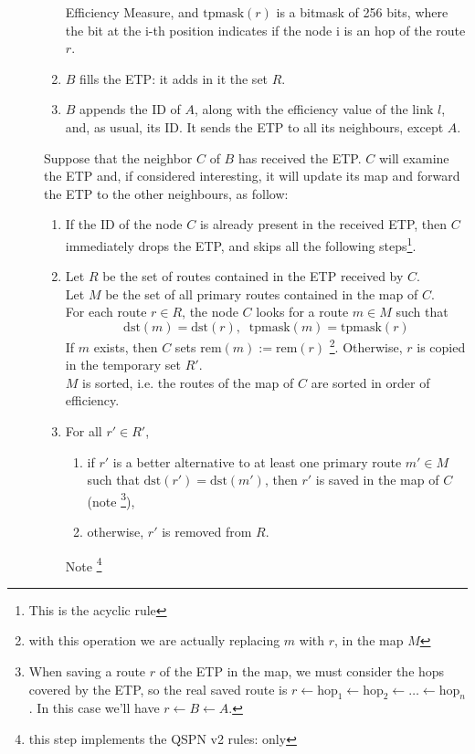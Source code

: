 \documentclass[a4paper]{article}
\newcommand{\T}[1]{\textrm{#1}}
\begin{document}
\begin{description}
\begin{enumerate}
			Efficiency Measure, and $\T{tpmask}(r)$ is a bitmask of 256
			bits, where the bit at the i-th position indicates if
			the node i is an hop of the route $r$.
		\item $B$ fills the ETP: it adds in it the set $R$.
		\item $B$ appends the ID of $A$, along with the efficiency
			value of the link $l$, and, as usual, its ID. It sends
			the ETP to all its neighbours, except $A$.
		\end{enumerate}
		\label{ETPrule1}
		Suppose that the neighbor $C$ of $B$ has received the ETP. $C$
		will examine the ETP and, if considered interesting, it 
	will update its map and forward the ETP to the other neighbours, as
		follow:
		\begin{enumerate}
		\item If the ID of the node $C$ is already present in the
			received ETP, then $C$ immediately drops the ETP, and
			skips all the following steps\footnote{This is the acyclic
			rule}.
		\item Let $R$ be the set of routes contained in the
			ETP received by $C$.\\
			Let $M$ be the set of all primary routes contained in the map of $C$.\\
		For each route $r\in R$, the node $C$ looks for 
		a route $m\in M$ such that 
		\[\T{dst}(m)=\T{dst}(r),\;\;\T{tpmask}(m)=\T{tpmask}(r)\]
		If $m$ exists, then $C$ sets $\T{rem}(m):=\T{rem}(r)$
		\footnote{with this operation we are actually replacing $m$
		with $r$, in the map $M$}.
		Otherwise, $r$ is copied in the temporary set $R'$.\\
		$M$ is sorted, i.e. the routes of the map of $C$ are sorted in
		order of efficiency.
	\item For all $r' \in R'$,
		\begin{enumerate}
			\item if $r'$ is a better alternative to at least one primary route
				$m'\in M$ such that $\T{dst}(r')=\T{dst}(m')$,
				then $r'$  is saved in the map of $C$
				(note \footnote{When saving a route $r$ of the ETP
				in the map, we must consider the hops covered by the ETP,
				so the real saved route is
				$r\leftarrow \T{hop}_1\leftarrow \T{hop}_2\leftarrow
				\dots\leftarrow \T{hop}_n$. In this
				case we'll have $r\leftarrow B\leftarrow A$.}), 
			\item otherwise, $r'$ is removed from $R$.
		\end{enumerate}
		Note \footnote{this step implements the QSPN v2 rules: only
}
\end{enumerate}
\end{description}
\end{document}
